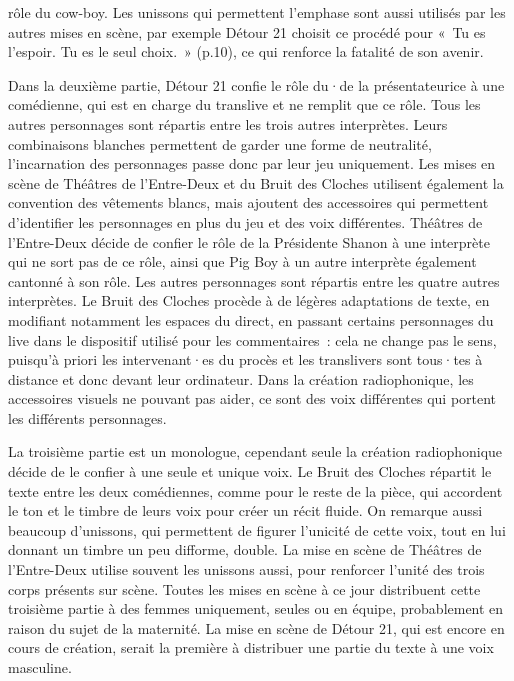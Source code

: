 \documentclass[
]{article}
\begin{document}
rôle du cow-boy. Les unissons qui permettent l'emphase sont aussi utilisés par les autres mises en scène, par exemple Détour 21 choisit ce procédé pour «~Tu es l'espoir. Tu es le seul choix.~» (p.10), ce qui renforce la fatalité de son avenir.

Dans la deuxième partie, Détour 21 confie le rôle du·de la présentateurice à une comédienne, qui est en charge du translive et ne remplit que ce rôle. Tous les autres personnages sont répartis entre les trois autres interprètes. Leurs combinaisons blanches permettent de garder une forme de neutralité, l'incarnation des personnages passe donc par leur jeu uniquement. Les mises en scène de Théâtres de l'Entre-Deux et du Bruit des Cloches utilisent également la convention des vêtements blancs, mais ajoutent des accessoires qui permettent d'identifier les personnages en plus du jeu et des voix différentes. Théâtres de l'Entre-Deux décide de confier le rôle de la Présidente Shanon à une interprète qui ne sort pas de ce rôle, ainsi que Pig Boy à un autre interprète également cantonné à son rôle. Les autres personnages sont répartis entre les quatre autres interprètes. Le Bruit des Cloches procède à de légères adaptations de texte, en modifiant notamment les espaces du direct, en passant certains personnages du live dans le dispositif utilisé pour les commentaires~: cela ne change pas le sens, puisqu'à priori les intervenant·es du procès et les translivers sont tous·tes à distance et donc devant leur ordinateur. Dans la création radiophonique, les accessoires visuels ne pouvant pas aider, ce sont des voix différentes qui portent les différents personnages.

La troisième partie est un monologue, cependant seule la création radiophonique décide de le confier à une seule et unique voix. Le Bruit des Cloches répartit le texte entre les deux comédiennes, comme pour le reste de la pièce, qui accordent le ton et le timbre de leurs voix pour créer un récit fluide. On remarque aussi beaucoup d'unissons, qui permettent de figurer l'unicité de cette voix, tout en lui donnant un timbre un peu difforme, double. La mise en scène de Théâtres de l'Entre-Deux utilise souvent les unissons aussi, pour renforcer l'unité des trois corps présents sur scène. Toutes les mises en scène à ce jour distribuent cette troisième partie à des femmes uniquement, seules ou en équipe, probablement en raison du sujet de la maternité. La mise en scène de Détour 21, qui est encore en cours de création, serait la première à distribuer une partie du texte à une voix masculine.
\end{document}
